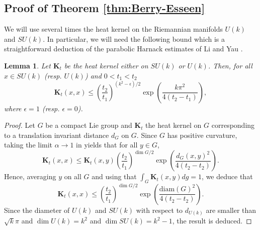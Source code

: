 \documentclass[10pt,11pt]{amsart}%
\newtheorem{lemma}[theorem]{Lemma}
\begin{document}
\subsection{Proof of Theorem \ref{thm:Berry-Esseen}}
We will use several times the heat kernel on the Riemannian manifolds $U(k)$ and $SU(k)$. In particular, we will need the following bound which is a straightforward deduction of the parabolic Harnack estimates of Li and Yau \cite[Thm 2.3]{LiYa}.
\begin{lemma}\label{lem:rough_bound_heat}
Let $\mathbf{K}_t$ be the heat kernel either on $SU(k)$ or $U(k)$. Then, for all $x\in SU(k)$ (resp. $U(k)$) and $0<t_1<t_2$
$$\mathbf{K}_t(x,x)\leq \left(\frac{t_2}{t_1}\right)^{(k^2-\epsilon)/2}\exp\left(\frac{k\pi^2}{4(t_2-t_1)}\right),$$
where $\epsilon=1$ (resp. $\epsilon=0$). 
\end{lemma}
\begin{proof}
Let $G$ be a compact Lie group and $\mathbf{K}_t$ the heat kernel on $G$ corresponding to a translation invariant distance $d_G$ on $G$. Since $G$ has positive curvature, taking the limit $\alpha\rightarrow 1$ in \cite[Theorem 2.3]{LiYa} yields that for all $y\in G$,
$$\mathbf{K}_{t}(x,x)\leq \mathbf{K}_{t}(x,y)\left(\frac{t_2}{t_1}\right)^{\dim G/2}\exp\left(\frac{d_{G}(x,y)^2}{4(t_2-t_2)}\right).$$
Hence, averaging $y$ on all $G$ and using that $\int_{G}\mathbf{K}_{t}(x,y)dg=1$, we deduce that
$$\mathbf{K}_{t}(x,x)\leq \left(\frac{t_2}{t_1}\right)^{\dim G/2}\exp\left(\frac{\text{diam}(G)^2}{4(t_2-t_2)}\right).$$
Since the diameter of $U(k)$ and $SU(k)$ with respect to $d_{U(k)}$ are smaller than $\sqrt{k}\pi$ and $\dim U(k)=k^2$ and $\dim SU(k)=k^2-1$, the result is deduced.
\end{proof}
\end{document}

